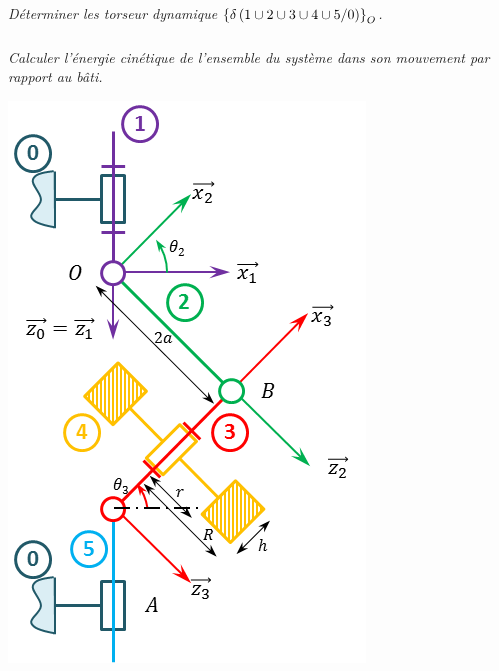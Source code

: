 \documentclass[10pt,fleqn]{article} %
\begin{document}
\begin{multicols}{2}
\subparagraph{}
\textit{Déterminer les torseur dynamique $\left\{\delta \left(1\cup 2\cup 3\cup 4\cup 5/0 \right) \right\}_O$.}
\ifprof
\begin{corrige}
\end{corrige}
\else
\fi


\subparagraph{}
\textit{Calculer l'énergie cinétique de l'ensemble du système dans son mouvement par rapport au bâti.}
\ifprof
\begin{corrige}
\end{corrige}
\else
\fi



\begin{center}
\includegraphics[width=\linewidth]{images/Schema_Cin.png}
\end{center}


\ifprof
\else
\end{multicols}
\fi
\end{document}
